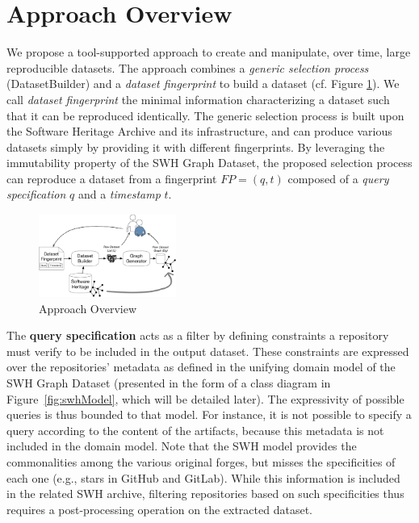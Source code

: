 \section{Approach Overview}
\label{sec:approach}

We propose a tool-supported approach to create and manipulate, over time, large reproducible datasets. 
The approach combines a \textit{generic selection process} (DatasetBuilder) and a \textit{dataset fingerprint }to build a dataset (cf. Figure \ref{fig:appraoch}).
We call \textit{dataset fingerprint} the minimal information characterizing a dataset such that it can be reproduced identically.
The generic selection process is built upon the Software Heritage Archive and its infrastructure, and can produce various datasets simply by providing it with different fingerprints.
By leveraging the immutability property of the SWH Graph Dataset, the proposed selection process can reproduce a dataset from a fingerprint $FP=(q,t)$ composed of a \emph{query specification} $q$ and a \emph{timestamp} $t$.


\begin{figure}
    \center \includegraphics[width=0.4\textwidth]{images/appraoch.pdf}
    \vspace{-5 pt}

    \caption{Approach Overview}
    \label{fig:appraoch} 
    \vspace{-1.5 em}

\end{figure}

The \textbf{query specification} acts as a filter by defining constraints a repository must verify to be included in the output dataset.
These constraints are expressed over the repositories' metadata as defined in the unifying domain model of the SWH Graph Dataset (presented in the form of a class diagram in Figure~\ref{fig:swhModel}, which will be detailed later).
The expressivity of possible queries is thus bounded to that model. 
For instance, it is not possible to specify a query according to the content of the artifacts, because this metadata is not included in the domain model. 
Note that the SWH model provides the commonalities among the various original forges, but misses the specificities of each one (e.g., stars in GitHub and GitLab). 
While this information is included in the related SWH archive, filtering repositories based on such specificities thus requires a post-processing operation on the extracted dataset.

